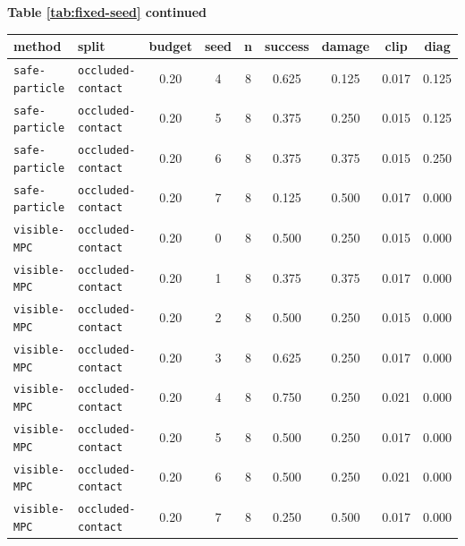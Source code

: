 \documentclass{article}
\begin{document}
\begin{center}
\textbf{Table \ref{tab:fixed-seed} continued}\\[0.4ex]
\begin{tabular}{llccccccc}
\toprule
method & split & budget & seed & n & success & damage & clip & diag \\
\midrule
\texttt{safe-particle} & \texttt{occluded-contact} & 0.20 & 4 & 8 & 0.625 & 0.125 & 0.017 & 0.125 \\
\texttt{safe-particle} & \texttt{occluded-contact} & 0.20 & 5 & 8 & 0.375 & 0.250 & 0.015 & 0.125 \\
\texttt{safe-particle} & \texttt{occluded-contact} & 0.20 & 6 & 8 & 0.375 & 0.375 & 0.015 & 0.250 \\
\texttt{safe-particle} & \texttt{occluded-contact} & 0.20 & 7 & 8 & 0.125 & 0.500 & 0.017 & 0.000 \\
\texttt{visible-MPC} & \texttt{occluded-contact} & 0.20 & 0 & 8 & 0.500 & 0.250 & 0.015 & 0.000 \\
\texttt{visible-MPC} & \texttt{occluded-contact} & 0.20 & 1 & 8 & 0.375 & 0.375 & 0.017 & 0.000 \\
\texttt{visible-MPC} & \texttt{occluded-contact} & 0.20 & 2 & 8 & 0.500 & 0.250 & 0.015 & 0.000 \\
\texttt{visible-MPC} & \texttt{occluded-contact} & 0.20 & 3 & 8 & 0.625 & 0.250 & 0.017 & 0.000 \\
\texttt{visible-MPC} & \texttt{occluded-contact} & 0.20 & 4 & 8 & 0.750 & 0.250 & 0.021 & 0.000 \\
\texttt{visible-MPC} & \texttt{occluded-contact} & 0.20 & 5 & 8 & 0.500 & 0.250 & 0.017 & 0.000 \\
\texttt{visible-MPC} & \texttt{occluded-contact} & 0.20 & 6 & 8 & 0.500 & 0.250 & 0.021 & 0.000 \\
\texttt{visible-MPC} & \texttt{occluded-contact} & 0.20 & 7 & 8 & 0.250 & 0.500 & 0.017 & 0.000 \\
\bottomrule
\end{tabular}
\end{center}
\normalsize
\end{document}
